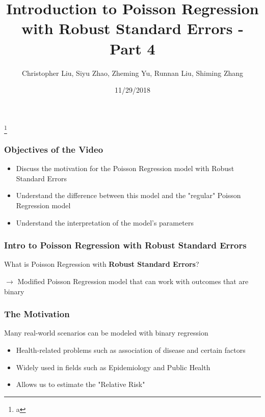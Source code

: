 \documentclass{beamer}
\title{Introduction to Poisson Regression with Robust Standard Errors - Part 4}
\author{Christopher Liu, Siyu Zhao, Zheming Yu, Runnan Liu, Shiming Zhang}
\institute{San Diego State University, Stats 610}
\date{11/29/2018}
\begin{document}
\begin{frame}[plain]

	\titlepage
	
	\footnote{a}

\end{frame}


	
\begin{frame}[fragile]\frametitle{Objectives of the Video}

	\begin{itemize}
	
		\item Discuss the motivation for the Poisson Regression model with Robust Standard Errors
			
		\item Understand the difference between this model and the "regular" Poisson Regression model		
				
		\item Understand the interpretation of the model's parameters
	
	\end{itemize}	

\end{frame}



\begin{frame}[fragile]\frametitle{Intro to Poisson Regression with Robust Standard Errors}
	
	What is Poisson Regression with \textbf{Robust Standard Errors}?

	$\rightarrow$ Modified Poisson Regression model that can work with outcomes that are binary

\end{frame}



\begin{frame}[fragile]\frametitle{The Motivation}

	Many real-world scenarios can be modeled with binary regression
	
	\begin{itemize}
	
		\item Health-related problems such as association of disease and certain factors
		
		\item Widely used in fields such as Epidemiology and Public Health
		
		\item Allows us to estimate the "Relative Risk"
	
	\end{itemize}
	
\end{frame}
\end{document}
